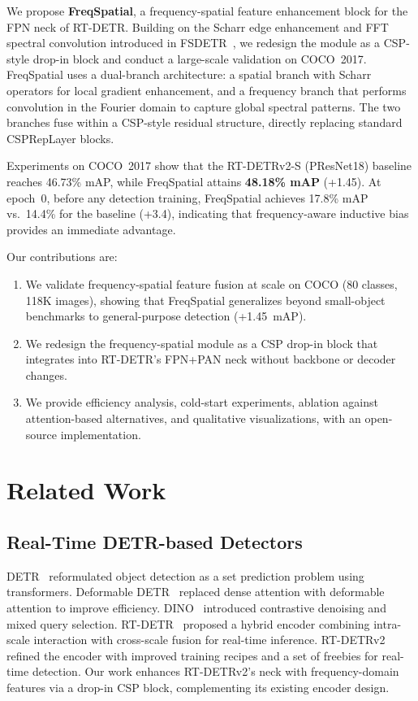 \documentclass[10pt,twocolumn]{IEEEtran}
\begin{document}
We propose \textbf{FreqSpatial}, a frequency-spatial
feature enhancement block for the FPN neck of RT-DETR. Building on the
Scharr edge enhancement and FFT spectral convolution introduced
in FSDETR~\cite{fsdetr}, we redesign the module as a CSP-style drop-in block and conduct a large-scale validation
on COCO~2017. FreqSpatial uses a dual-branch architecture: a spatial branch
with Scharr operators for local gradient enhancement, and a frequency branch
that performs convolution in the Fourier domain to capture global spectral
patterns. The two branches fuse within a CSP-style residual structure, directly
replacing standard CSPRepLayer blocks.

Experiments on COCO~2017 show that the RT-DETRv2-S (PResNet18) baseline reaches
46.73\% mAP, while FreqSpatial attains \textbf{48.18\% mAP} (+1.45).
At epoch~0, before any detection training, FreqSpatial achieves 17.8\% mAP
vs.\ 14.4\% for the baseline (+3.4), indicating that frequency-aware
inductive bias provides an immediate advantage.

Our contributions are:
\begin{enumerate}
\item We validate frequency-spatial feature fusion at scale on COCO (80 classes,
  118K images), showing that FreqSpatial generalizes beyond small-object
  benchmarks to general-purpose detection (+1.45~mAP).
\item We redesign the frequency-spatial module as a CSP drop-in block that
  integrates into RT-DETR's FPN+PAN neck without backbone or decoder changes.
\item We provide efficiency analysis, cold-start experiments, ablation against
  attention-based alternatives, and qualitative visualizations, with an open-source
  implementation.
\end{enumerate}

\section{Related Work}
\label{sec:related}

\subsection{Real-Time DETR-based Detectors}

DETR~\cite{carion2020detr} reformulated object detection as a set prediction
problem using transformers. Deformable DETR~\cite{zhu2020deformable} replaced
dense attention with deformable attention to improve efficiency. DINO~\cite{zhang2022dino}
introduced contrastive denoising and mixed query selection.
RT-DETR~\cite{lv2023detrs} proposed a hybrid encoder combining intra-scale
interaction with cross-scale fusion for real-time inference.
RT-DETRv2~\cite{lv2024rtdetrv2} refined the encoder with improved training
recipes and a set of freebies for real-time detection.
Our work enhances RT-DETRv2's neck with frequency-domain features via a
drop-in CSP block, complementing its existing encoder design.
\end{document}
